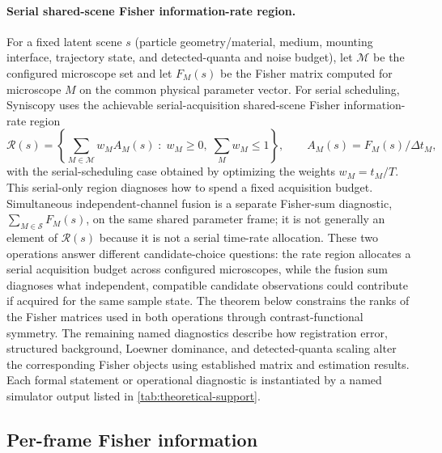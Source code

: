 \paragraph{Serial shared-scene Fisher information-rate region.}
For a fixed latent scene $s$ (particle geometry/material, medium, mounting interface, trajectory state, and detected-quanta and noise budget), let $\mathcal{M}$ be the configured microscope set and let $F_M(s)$ be the Fisher matrix computed for microscope $M$ on the common physical parameter vector. For serial scheduling, Syniscopy uses the achievable serial-acquisition shared-scene Fisher information-rate region
\begin{equation}
  \mathcal{R}(s)
  =
  \left\{
    \sum_{M\in\mathcal{M}} w_M A_M(s)
    \;:\;
    w_M\ge 0,\;\sum_M w_M \le 1
  \right\},
  \qquad
  A_M(s)=F_M(s)/\Delta t_M ,
\end{equation}
with the serial-scheduling case obtained by optimizing the weights $w_M=t_M/T$. This serial-only region diagnoses how to spend a fixed acquisition budget. Simultaneous independent-channel fusion is a separate Fisher-sum diagnostic, $\sum_{M\in\mathcal{S}}F_M(s)$, on the same shared parameter frame; it is not generally an element of $\mathcal{R}(s)$ because it is not a serial time-rate allocation. These two operations answer different candidate-choice questions: the rate region allocates a serial acquisition budget across configured microscopes, while the fusion sum diagnoses what independent, compatible candidate observations could contribute if acquired for the same sample state. The theorem below constrains the ranks of the Fisher matrices used in both operations through contrast-functional symmetry. The remaining named diagnostics describe how registration error, structured background, Loewner dominance, and detected-quanta scaling alter the corresponding Fisher objects using established matrix and estimation results. Each formal statement or operational diagnostic is instantiated by a named simulator output listed in \cref{tab:theoretical-support}.

\subsection{Per-frame Fisher information}

